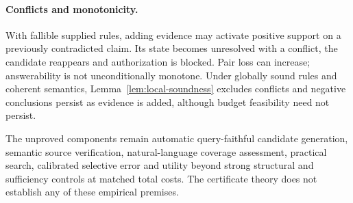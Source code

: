 \paragraph{Conflicts and monotonicity.}
With fallible supplied rules, adding evidence may activate positive support on
a previously contradicted claim. Its state becomes unresolved with a conflict,
the candidate reappears and authorization is blocked. Pair loss can increase;
answerability is not unconditionally monotone. Under globally sound rules and
coherent semantics, Lemma~\ref{lem:local-soundness} excludes conflicts and
negative conclusions persist as evidence is added, although budget feasibility
need not persist.

The unproved components remain automatic query-faithful candidate generation,
semantic source verification, natural-language coverage assessment, practical
search, calibrated selective error and utility beyond strong structural and
sufficiency controls at matched total costs. The certificate theory does not
establish any of these empirical premises.

